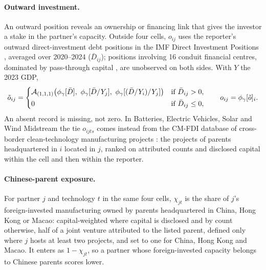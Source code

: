 \paragraph{Outward investment.} An outward position reveals an ownership or financing link that gives
the investor a stake in the partner's capacity. Outside four cells, $o_{ij}$ uses the reporter's
outward direct-investment debt positions in the IMF Direct Investment Positions \citep{imf2026dip},
averaged over 2020--2024 ($\bar D_{ij}$); positions involving 16 conduit financial centres,
dominated by pass-through capital \citep{damgaard2024real}, are unobserved on both sides. With $Y$
the 2023 GDP,
\begin{equation}\label{eq:outbound}
  \tilde o_{ij}=
  \begin{cases}
    \mathcal{A}_{(1,1,1)}\bigl({\phi_{\gamma}}[\bar D],\ {\phi_{\gamma}}[\bar D/Y_j],\ {\phi_{\gamma}}[(\bar D/Y_i)/Y_j]\bigr)
      & \text{if } \bar D_{ij}>0,\\[2pt]
    0 & \text{if } \bar D_{ij}\le 0,
  \end{cases}
  \qquad
  o_{ij}={\phi_{\gamma}}[\tilde o]_{i}.
\end{equation}
An absent record is missing, not zero. In Batteries, Electric Vehicles, Solar and Wind Midstream the
tie $o_{ijts}$ comes instead from the CM-FDI database of cross-border clean-technology manufacturing
projects \citep{bandara2026cmfdi}: the projects of parents headquartered in $i$ located in $j$,
ranked on attributed counts and disclosed capital within the cell and then within the reporter.

\paragraph{Chinese-parent exposure.} For partner $j$ and technology $t$ in the same four cells,
$\chi_{jt}$ is the share of $j$'s foreign-invested manufacturing owned by parents headquartered in
China, Hong Kong or Macao: capital-weighted where capital is disclosed and by count otherwise, half
of a joint venture attributed to the listed parent, defined only where $j$ hosts at least two
projects, and set to one for China, Hong Kong and Macao. It enters as $1-\chi_{jt}$, so a partner
whose foreign-invested capacity belongs to Chinese parents scores lower.

